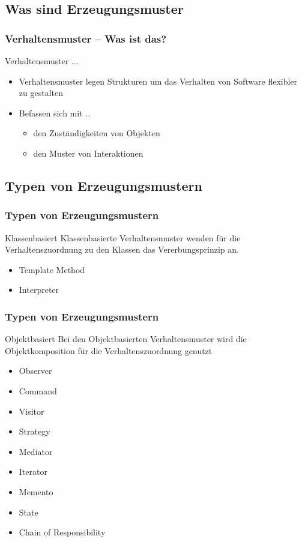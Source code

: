 \subsection{Was sind Erzeugungsmuster}


\begin{frame}
	\frametitle{Verhaltensmuster -- Was ist das?}
	\begin{block}{Verhaltensmuster ...}
	\begin{itemize}
		\item Verhaltensmuster legen Strukturen um das Verhalten von Software flexibler zu gestalten
		\item Befassen sich mit ..
		\begin{itemize}
			\item den Zuständigkeiten von Objekten
			\item den Muster von Interaktionen
		\end{itemize}
	\end{itemize}
	\end{block}	
\end{frame}


\subsection{Typen von Erzeugungsmustern}
\begin{frame}
	\frametitle{Typen von Erzeugungsmustern}
	\begin{block}{Klassenbasiert}
		Klassenbasierte Verhaltensmuster wenden für die Verhaltenszuordnung zu den Klassen das Vererbungsprinzip an. 
		\begin{itemize}
			\item Template Method
			\item Interpreter
		\end{itemize} 	
	\end{block}
\end{frame}

\begin{frame}
	\frametitle{Typen von Erzeugungsmustern}
	\begin{block}{Objektbasiert}
		Bei den Objektbasierten Verhaltensmuster wird die Objektkomposition für die Verhaltenszuordnung genutzt
				\begin{itemize}
					\item \alert<1-> {Observer}
					\item \alert<1-> {Command}
					\item \alert<1-> {Visitor}
					\item Strategy			
					\item Mediator
					\item Iterator
					\item Memento 
					\item State
					\item Chain of Responsibility
				\end{itemize}	
	\end{block}
\end{frame}
